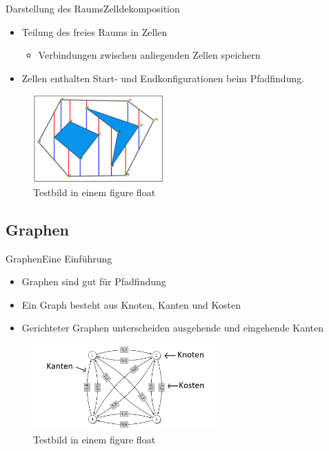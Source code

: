 \documentclass[t,aspectratio=169,dvipsnames]{beamer}
\begin{document}
\begin{frame}{Darstellung des Raums}{Zelldekomposition}
	\begin{itemize}
		\item Teilung des freies Raums in Zellen
		\begin{itemize}
			\item Verbindungen zwischen anliegenden Zellen speichern
		\end{itemize}
	    \item Zellen enthalten Start- und Endkonfigurationen beim Pfadfindung.
	\end{itemize}
	
	\begin{figure}
		\includegraphics[width=5.0cm]{images/Bild4.png}
		\caption{Testbild in einem figure float} 
	\end{figure}
\end{frame}
\subsection{Graphen}
\begin{frame}{Graphen}{Eine Einführung}
	\begin{itemize}
		\item Graphen sind gut für Pfadfindung
		\item Ein Graph besteht aus Knoten, Kanten und Kosten
		\item Gerichteter Graphen unterscheiden ausgehende und eingehende Kanten
	\end{itemize}
	
	\begin{figure}
		\includegraphics[width=7.0cm]{images/kk_graph_S6.png}
		\caption{Testbild in einem figure float} 
	\end{figure}
\end{frame}
\end{document}
